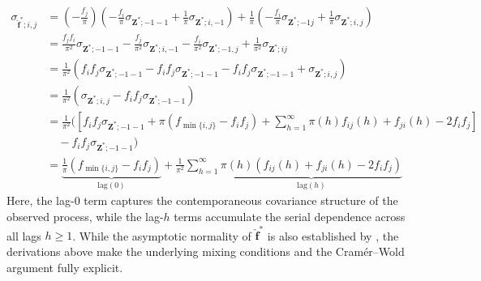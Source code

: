 ﻿\documentclass[12pt,a4paper]{scrreprt}
\theoremstyle{definition}
\begin{document}
\begin{align*}
    \sigma_{\hat{\boldsymbol{f}}^*; i, j}  &= (-\frac{f_j}{\pi}) (-\frac{f_i}{\pi}\sigma_{\boldsymbol{Z}^*; -1 -1} + \frac{1}{\pi} \sigma_{\boldsymbol{Z}^*; i, -1}) + \frac{1}{\pi}(-\frac{f_{i}}{\pi}\sigma_{\boldsymbol{Z}^*; -1 j}+ \frac{1}{\pi} \sigma_{\boldsymbol{Z}^*; i, j}) \\
    &= \frac{f_j f_i }{\pi^2} \sigma_{\boldsymbol{Z}^*; -1 -1} - \frac{f_j}{\pi^2} \sigma_{\boldsymbol{Z}^*; i, -1} - \frac{f_i}{\pi^2}\sigma_{\boldsymbol{Z}^*; -1, j} + \frac{1}{\pi^2} \sigma_{\boldsymbol{Z}^*; i j} \\
    &= \frac{1}{\pi^2}\left(f_if_j\sigma_{\boldsymbol{Z}^*; -1 -1} - f_if_j\sigma_{\boldsymbol{Z}^*; -1 -1} - f_if_j\sigma_{\boldsymbol{Z}^*; -1 -1} + \sigma_{\boldsymbol{Z}^*; i, j}\right) \\
    &= \frac{1}{\pi^2}(\sigma_{\boldsymbol{Z}^*; i, j}-f_if_j \sigma_{\boldsymbol{Z}^*; -1 -1}) \\
    &= \frac{1}{\pi^2}\biggl(\left[f_if_j\sigma_{\boldsymbol{Z}^*; -1 -1} + \pi(f_{\min \{i,j\}}- f_if_j) + \sum_{h=1}^{\infty}\pi(h)f_{ij}(h)+f_{ji}(h)-2f_if_j\right] \\
    &\quad - f_if_j \sigma_{\boldsymbol{Z}^*; -1 -1}\biggr) \\
    &= \underbrace{\frac{1}{\pi} (f_{\min \{i,j\}}- f_if_j) }_{\mathrm{lag}(0)}+ \frac{1}{\pi^2}\sum_{h=1}^{\infty}\underbrace{\pi(h)(f_{ij}(h)+f_{ji}(h)-2f_if_j)}_{\mathrm{lag}(h)}
\end{align*}
Here, the lag-0 term captures the contemporaneous covariance structure of the
observed process, while the lag-$h$ terms accumulate the serial dependence
across all lags $h \geq 1$. While the asymptotic normality of $\hat{\boldsymbol{f}}^*$
is also established by \citet{weiss2021categorical}, the derivations above make the underlying 
mixing conditions and the Cramér–Wold argument fully explicit.
\end{document}
